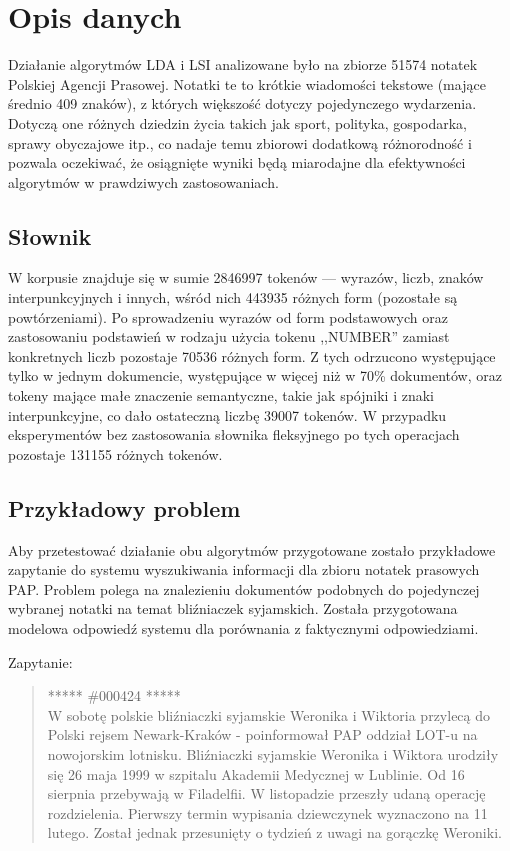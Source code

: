\documentclass[11pt,a4paper]{article}
\begin{document}
\pagebreak

\section{Opis danych}
\label{sec:data}
\label{data-description}

Działanie algorytmów LDA i LSI analizowane było na zbiorze 51574 notatek
Polskiej Agencji Prasowej. Notatki te to krótkie wiadomości tekstowe (mające
średnio 409 znaków), z których większość dotyczy pojedynczego wydarzenia.
Dotyczą one różnych dziedzin życia takich jak sport, polityka, gospodarka,
sprawy obyczajowe itp., co nadaje temu zbiorowi dodatkową różnorodność i
pozwala oczekiwać, że osiągnięte wyniki będą miarodajne dla efektywności
algorytmów w prawdziwych zastosowaniach.

\subsection{Słownik}

W korpusie znajduje się w sumie 2846997 tokenów --- wyrazów, liczb, znaków
interpunkcyjnych i innych, wśród nich 443935 różnych form (pozostałe są
powtórzeniami). Po sprowadzeniu wyrazów od form podstawowych oraz zastosowaniu
podstawień w rodzaju użycia tokenu ,,NUMBER'' zamiast konkretnych liczb
pozostaje 70536 różnych form. Z tych odrzucono występujące tylko w jednym
dokumencie, występujące w więcej niż w 70\% dokumentów, oraz tokeny mające małe
znaczenie semantyczne, takie jak spójniki i znaki interpunkcyjne, co dało
ostateczną liczbę 39007 tokenów. W przypadku eksperymentów bez zastosowania
słownika fleksyjnego po tych operacjach pozostaje 131155 różnych tokenów.

\subsection{Przykładowy problem}
\label{sec:example}

Aby przetestować działanie obu algorytmów przygotowane zostało przykładowe
zapytanie do systemu wyszukiwania informacji dla zbioru notatek prasowych PAP.
Problem polega na znalezieniu dokumentów podobnych do pojedynczej wybranej
notatki na temat bliźniaczek syjamskich. Została przygotowana modelowa
odpowiedź systemu dla porównania z faktycznymi odpowiedziami.

Zapytanie:

\begin{quote} ***** \#000424 *****\\ W sobotę polskie bliźniaczki syjamskie
Weronika i Wiktoria przylecą do Polski rejsem Newark-Kraków - poinformował PAP
oddział LOT-u na nowojorskim lotnisku.  Bliźniaczki syjamskie Weronika i
Wiktora urodziły się 26 maja 1999 w szpitalu Akademii Medycznej w Lublinie. Od
16 sierpnia przebywają w Filadelfii. W listopadzie przeszły udaną operację
rozdzielenia. Pierwszy termin wypisania dziewczynek wyznaczono na 11 lutego.
Został jednak przesunięty o tydzień z uwagi na gorączkę Weroniki.  \end{quote}
\end{document}
